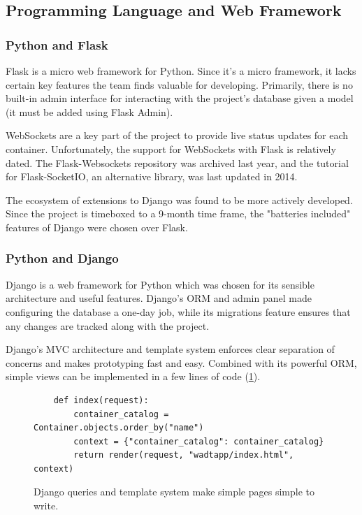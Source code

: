 \documentclass[12pt,titlepage]{article}
\begin{document}
\subsection{Programming Language and Web Framework}

\subsubsection{Python and Flask}
Flask is a micro web framework for Python. Since it's a micro framework, it lacks certain key features the team finds valuable for developing. Primarily, there is no built-in admin interface for interacting with the project's database given a model (it must be added using Flask Admin).

WebSockets are a key part of the project to provide live status updates for each container. Unfortunately, the support for WebSockets with Flask is relatively dated. The Flask-Websockets repository was archived last year, and the tutorial for Flask-SocketIO, an alternative library, was last updated in 2014.

The ecosystem of extensions to Django was found to be more actively developed. Since the project is timeboxed to a 9-month time frame, the "batteries included" features of Django were chosen over Flask.

\subsubsection{Python and Django}
Django is a web framework for Python which was chosen for its sensible architecture and useful features. Django's ORM and admin panel made configuring the database a one-day job, while its migrations feature ensures that any changes are tracked along with the project.

Django's MVC architecture and template system enforces clear separation of concerns and makes prototyping fast and easy. Combined with its powerful ORM, simple views can be implemented in a few lines of code (\ref{fig:indexview}).
\begin{figure}[H]
	\centering
	\begin{verbatim}
	def index(request):
	    container_catalog = Container.objects.order_by("name")
	    context = {"container_catalog": container_catalog}
	    return render(request, "wadtapp/index.html", context)
	\end{verbatim}
	\caption{Django queries and template system make simple pages simple to write.}
	\label{fig:indexview}
\end{figure}
\end{document}

